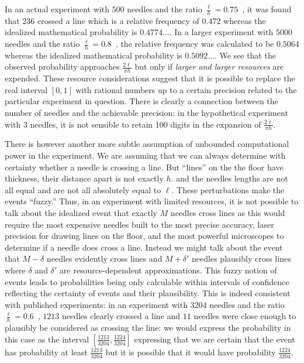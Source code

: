 \documentclass{article}
\theoremstyle{remark}
\begin{document}
In an actual experiment with $500$ needles and the ratio
$\frac{\ell}{h}=0.75$~\cite{Hall1873}, it was found that $236$ crossed
a line which is a relative frequency of $0.472$ whereas the idealized
mathematical probability is $0.4774\ldots$. In a larger experiment
with $5000$ needles and the ratio
$\frac{\ell}{h}=0.8$~\cite{Uspensky1937}, the relative frequency was
calculated to be $0.5064$ whereas the idealized mathematical
probability is $0.5092\ldots$. We see that the observed probability
approaches $\frac{2\ell}{\pi h}$ but only if \emph{larger and larger
  resources} are expended. These resource considerations suggest that
it is possible to replace the real interval $[0,1]$ with rational
numbers up to a certain precision related to the particular experiment
in question.  There is clearly a connection between the number of
needles and the achievable precision: in the hypothetical experiment
with 3 needles, it is not sensible to retain 100 digits in the
expansion of $\frac{2\ell}{\pi h}$.

There is however another more subtle assumption of unbounded
computational power in the experiment. We are assuming that we can
always determine with certainty whether a needle is crossing a
line. But ``lines'' on the the floor have thickness, their distance
apart is not exactly $h$. and the needles lengths are not all equal
and are not all absolutely equal to $\ell$. These perturbations make
the events ``fuzzy.'' Thus, in an experiment with limited resources,
it is not possible to talk about the idealized event that exactly $M$
needles cross lines as this would require the most expensive needles
built to the most precise accuracy, laser precision for drawing lines
on the floor, and the most powerful microscopes to determine if a
needle does cross a line. Instead we might talk about the event that
$M-\delta$ needles evidently cross lines and $M+\delta'$ needles
plausibly cross lines where $\delta$ and $\delta'$ are
resource-dependent approximations. This fuzzy notion of events leads
to probabilities being only calculable within intervals of confidence
reflecting the certainty of events and their plausibility. This is
indeed consistent with published experiments: in an experiment with
$3204$ needles and the ratio $\frac{\ell}{h}=0.6$~\cite{DeMorgan1872},
$1213$ needles clearly crossed a line and $11$ needles were close
enough to plausibly be considered as crossing the line: we would
express the probability in this case as the interval
$\left[\frac{1213}{3204},\frac{1224}{3204}\right]$ expressing that we
are certain that the event has probability at least
$\frac{1213}{3204}$ but it is possible that it would have probability
$\frac{1224}{3204}$.
\end{document}
